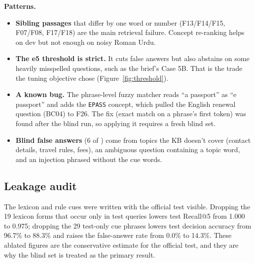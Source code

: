 \documentclass[11pt,a4paper]{article}
\begin{document}
\textbf{Patterns.}
\begin{itemize}
  \item \textbf{Sibling passages} that differ by one word or number (F13/F14/F15, F07/F08, F17/F18) are the main retrieval
        failure. Concept re-ranking helps on dev but not enough on noisy Roman Urdu.
  \item \textbf{The e5 threshold is strict.} It cuts false answers but also abstains on some heavily misspelled questions,
        such as the brief's Case 5B. That is the trade the tuning objective chose (Figure~\ref{fig:threshold}).
  \item \textbf{A known bug.} The phrase-level fuzzy matcher reads ``a passport'' as ``e passport'' and adds the
        \texttt{EPASS} concept, which pulled the English renewal question (BC04) to F26. The fix (exact match on a phrase's
        first token) was found after the blind run, so applying it requires a fresh blind set.
  \item \textbf{Blind false answers} (6 of \BlindNFalse) come from topics the KB doesn't cover (contact details, travel rules,
        fees), an ambiguous question containing a topic word, and an injection phrased without the cue words.
\end{itemize}

\subsection{Leakage audit}
The lexicon and rule cues were written with the official test visible. Dropping the 19 lexicon forms that occur only in test
queries lowers test Recall@5 from 1.000 to 0.975; dropping the 29 test-only cue phrases lowers test decision accuracy from 96.7\%
to 88.3\% and raises the false-answer rate from 0.0\% to 14.3\%. These ablated figures are the conservative estimate for the
official test, and they are why the blind set is treated as the primary result.

\end{document}
